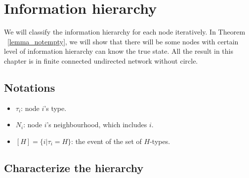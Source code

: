 \documentclass[12pt]{article}
\theoremstyle{remark}
\theoremstyle{remark}
\begin{document}


\section{Information hierarchy}
\label{sec_information_hierarchy}

We will classify the information hierarchy for each node iteratively. In Theorem ~\ref{lemma_notempty}, we will show that there will be some nodes with certain level of information hierarchy can know the true state. All the result in this chapter is in finite connected undirected network without circle. 


\subsection{Notations}
\begin{itemize}
\item $\tau_i$: node $i$'s type.
\item $N_i$: node $i$'s neighbourhood, which includes $i$.
\item $[H]=\{i|\tau_i=H\}$: the event of the set of $H$-types.
\end{itemize}

\subsection{Characterize the hierarchy}
\end{document}
